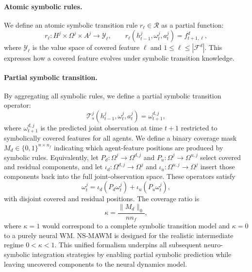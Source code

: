 \documentclass{article}
\theoremstyle{plain}
\theoremstyle{definition}
\theoremstyle{remark}
\begin{document}
\paragraph{Atomic symbolic rules.} We define an atomic symbolic transition rule $r_\ell \in \mathcal{R}$ as a partial function:
\begin{equation}
  r_\ell : H^j \times \Omega^j \times A^j \rightarrow \mathcal{Y}_\ell,
  \qquad
  r_\ell(h^j_{t-1}, \omega^j_t, a^j_t)=f^d_{t+1,\ell},
  \label{eq:atomic_rule}
\end{equation}
where $\mathcal{Y}_\ell$ is the value space of covered feature $\ell$ and $1\leq \ell \leq |\mathcal{F}^d|$. This expresses how a covered feature evolves under symbolic transition knowledge.

\paragraph{Partial symbolic transition.} By aggregating all symbolic rules, we define a partial symbolic transition operator:
\begin{equation}
  \mathcal{T}^j_s(h^j_{t-1}, \omega^j_t, a^j_t) = \omega^{d,j}_{t+1},
  \label{eq:symbolic_transition}
\end{equation}
where $\omega^{d,j}_{t+1}$ is the predicted joint observation at time $t+1$ restricted to symbolically covered features for all agents.
%
We define a binary coverage mask $M_d \in \{0,1\}^{n \times n_f}$ indicating which agent-feature positions are produced by symbolic rules. Equivalently, let $P_d:\Omega^j\rightarrow\Omega^{d,j}$ and $P_u:\Omega^j\rightarrow\Omega^{u,j}$ select covered and residual components, and let $\iota_d:\Omega^{d,j}\rightarrow\Omega^j$ and $\iota_u:\Omega^{u,j}\rightarrow\Omega^j$ insert those components back into the full joint-observation space. These operators satisfy
\begin{equation}
  \omega^j_t = \iota_d(P_d\omega^j_t) + \iota_u(P_u\omega^j_t),
  \label{eq:selection_insertion}
\end{equation}
with disjoint covered and residual positions. The coverage ratio is
\begin{equation}
  \kappa = \frac{\|M_d\|_0}{n n_f},
  \label{eq:coverage_ratio}
\end{equation}
where $\kappa=1$ would correspond to a complete symbolic transition model and $\kappa=0$ to a purely neural WM. NS-MAWM is designed for the realistic intermediate regime $0 < \kappa < 1$.
This unified formalism underpins all subsequent neuro-symbolic integration strategies by enabling partial symbolic prediction while leaving uncovered components to the neural dynamics model.
\end{document}
